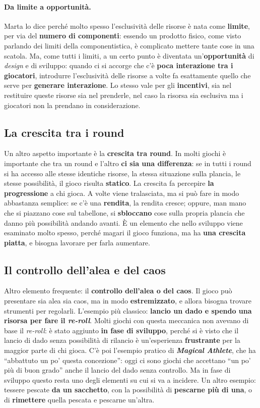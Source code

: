 \paragraph{Da limite a opportunità.} Marta lo dice perché molto spesso l'esclusività delle
risorse è nata come \textbf{limite}, per via del \textbf{numero di componenti}: essendo un
prodotto fisico, come visto parlando dei limiti della componentistica, è complicato mettere
tante cose in una scatola. Ma, come tutti i limiti, a un certo punto è diventata
un'\textbf{opportunità} di \emph{design} e di sviluppo: quando ci si accorge che c'è
\textbf{poca interazione tra i giocatori}, introdurre l'esclusività delle risorse a volte fa
esattamente quello che serve per \textbf{generare interazione}. Lo stesso vale per gli
\textbf{incentivi}, sia nel restituire queste risorse sia nel prenderle, nel caso la risorsa
sia esclusiva ma i giocatori non la prendano in considerazione.

\subsection{La crescita tra i round}

Un altro aspetto importante è la \textbf{crescita tra round}. In molti giochi è importante che
tra un round e l'altro \textbf{ci sia una differenza}: se in tutti i round si ha accesso alle
stesse identiche risorse, la stessa situazione sulla plancia, le stesse possibilità, il gioco
risulta \textbf{statico}. La crescita fa percepire \textbf{la progressione} a chi gioca. A volte
viene tralasciata, ma si può fare in modo abbastanza semplice: se c'è una \textbf{rendita}, la
rendita cresce; oppure, man mano che si piazzano cose sul tabellone, si \textbf{sbloccano} cose
sulla propria plancia che danno più possibilità andando avanti. È un elemento che nello
sviluppo viene esaminato molto spesso, perché magari il gioco funziona, ma ha \textbf{una
crescita piatta}, e bisogna lavorare per farla aumentare.

\subsection{Il controllo dell'alea e del caos}

Altro elemento frequente: il \textbf{controllo dell'alea o del caos}. Il gioco può presentare
sia alea sia caos, ma in modo \textbf{estremizzato}, e allora bisogna trovare strumenti per
regolarli. L'esempio più classico: \textbf{lancio un dado e spendo una risorsa per fare il
\emph{re-roll}}. Molti giochi con questa meccanica non avevano di base il \emph{re-roll}: è
stato aggiunto \textbf{in fase di sviluppo}, perché si è visto che il lancio di dado senza
possibilità di rilancio è un'esperienza \textbf{frustrante} per la maggior parte di chi gioca.
C'è poi l'esempio pratico di \textbf{\emph{Magical Athlete}}, che ha ``abbattuto un po' questa
concezione'': oggi ci sono giochi che accettano ``un po' più di buon grado'' anche il lancio
del dado senza controllo. Ma in fase di sviluppo questo resta uno degli elementi su cui si va a
incidere. Un altro esempio: tessere pescate \textbf{da un sacchetto}, con la possibilità di
\textbf{pescarne più di una}, o di \textbf{rimettere} quella pescata e pescarne un'altra.

